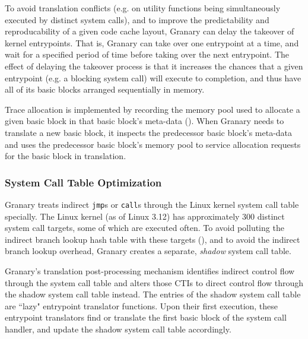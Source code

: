 \documentclass[preprint]{sigplanconf}
\begin{document}
To avoid translation conflicts (e.g. on utility functions being simultaneously executed by distinct system calls), and to improve the predictability and reproducability of a given code cache layout, Granary can delay the takeover of kernel entrypoints. That is, Granary can take over one entrypoint at a time, and wait for a specified period of time before taking over the next entrypoint. The effect of delaying the takeover process is that it increases the chances that a given entrypoint (e.g. a blocking system call) will execute to completion, and thus have all of its basic blocks  arranged sequentially in memory.

Trace allocation is implemented by recording the memory pool used to allocate a given basic block in that basic block's meta-data (). When Granary needs to translate a new basic block, it inspects the predecessor basic block's meta-data and uses the predecessor basic block's memory pool to service allocation requests for the basic block in translation.

\subsubsection{System Call Table Optimization}

Granary treats indirect \texttt{jmp}s or \texttt{call}s through the Linux kernel system call table specially. The Linux kernel (as of Linux 3.12) has approximately 300 distinct system call targets, some of which are executed often. To avoid polluting the indirect branch lookup hash table with these targets (), and to avoid the indirect branch lookup overhead, Granary creates a separate, \emph{shadow} system call table.

Granary's translation post-processing mechanism identifies indirect control flow through the system call table and alters those CTIs to direct control flow through the shadow system call table instead. The entries of the shadow system call table are ``lazy" entrypoint translator functions. Upon their first execution, these entrypoint translators find or translate the first basic block of the system call handler, and update the shadow system call table accordingly. 
\end{document}
